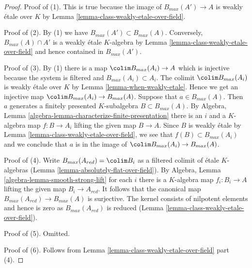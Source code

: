 \begin{proof}
Proof of (1). This is true because the image of $B_{max}(A') \to A$
is weakly \'etale over $K$ by Lemma \ref{lemma-class-weakly-etale-over-field}.

\medskip\noindent
Proof of (2). By (1) we have $B_{max}(A') \subset B_{max}(A)$.
Conversely, $B_{max}(A) \cap A'$ is a weakly \'etale $K$-algebra
by Lemma \ref{lemma-class-weakly-etale-over-field} and hence
contained in $B_{max}(A')$.

\medskip\noindent
Proof of (3). By (1) there is a map $\colim B_{max}(A_i) \to A$
which is injective because the system is filtered and
$B_{max}(A_i) \subset A_i$. The colimit $\colim B_{max}(A_i)$
is weakly \'etale over $K$ by
Lemma \ref{lemma-when-weakly-etale}.
Hence we get an injective map $\colim B_{max}(A_i) \to B_{max}(A)$.
Suppose that $a \in B_{max}(A)$. Then $a$ generates a finitely presented
$K$-subalgebra $B \subset B_{max}(A)$.
By Algebra, Lemma \ref{algebra-lemma-characterize-finite-presentation}
there is an $i$ and a $K$-algebra map $f : B \to A_i$
lifting the given map $B \to A$.
Since $B$ is weakly \'etale by
Lemma \ref{lemma-class-weakly-etale-over-field},
we see that $f(B) \subset B_{max}(A_i)$ and we conclude that $a$
is in the image of $\colim B_{max}(A_i) \to B_{max}(A)$.

\medskip\noindent
Proof of (4). Write $B_{max}(A_{red}) = \colim B_i$
as a filtered colimit of \'etale $K$-algebras
(Lemma \ref{lemma-absolutely-flat-over-field}).
By Algebra, Lemma \ref{algebra-lemma-smooth-strong-lift}
for each $i$ there is a $K$-algebra map $f_i : B_i \to A$
lifting the given map $B_i \to A_{red}$. It follows that the
canonical map $B_{max}(A_{red}) \to B_{max}(A)$ is surjective.
The kernel consists of nilpotent elements and hence is zero
as $B_{max}(A_{red})$ is reduced
(Lemma \ref{lemma-class-weakly-etale-over-field}).

\medskip\noindent
Proof of (5). Omitted.

\medskip\noindent
Proof of (6). Follows from Lemma \ref{lemma-class-weakly-etale-over-field}
part (4).
\end{proof}
